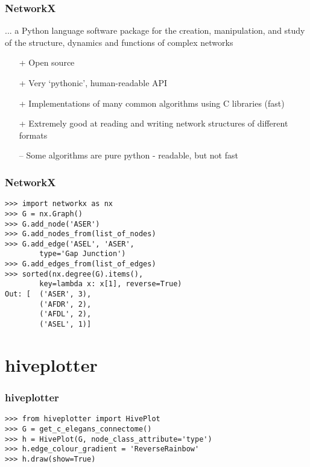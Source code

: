 \documentclass{beamer}
\begin{document}
\begin{frame}

\frametitle{NetworkX}
\begin{block}{}
... a Python language software package for the creation, manipulation, and study of the structure, dynamics and functions of complex networks
\end{block}

\begin{itemize}
\item[+] Open source
\item[+] Very `pythonic', human-readable API
\item[+] Implementations of many common algorithms using C libraries (fast)
\item[+] Extremely good at reading and writing network structures of different formats
\item[--] Some algorithms are pure python - readable, but not fast 
\end{itemize}

\end{frame}

\begin{frame}[fragile]
\frametitle{NetworkX}

\begin{lstlisting}
>>> import networkx as nx
>>> G = nx.Graph()
>>> G.add_node('ASER')
>>> G.add_nodes_from(list_of_nodes)
>>> G.add_edge('ASEL', 'ASER',
        type='Gap Junction')
>>> G.add_edges_from(list_of_edges)
>>> sorted(nx.degree(G).items(),
        key=lambda x: x[1], reverse=True)
Out: [  ('ASER', 3),
        ('AFDR', 2),
        ('AFDL', 2),
        ('ASEL', 1)]
\end{lstlisting}
\end{frame}

\section{hiveplotter}

\begin{frame}[fragile]
\frametitle{hiveplotter}
\begin{lstlisting}
>>> from hiveplotter import HivePlot
>>> G = get_c_elegans_connectome()
>>> h = HivePlot(G, node_class_attribute='type')
>>> h.edge_colour_gradient = 'ReverseRainbow'
>>> h.draw(show=True)
\end{lstlisting}
\end{frame}
\end{document}
